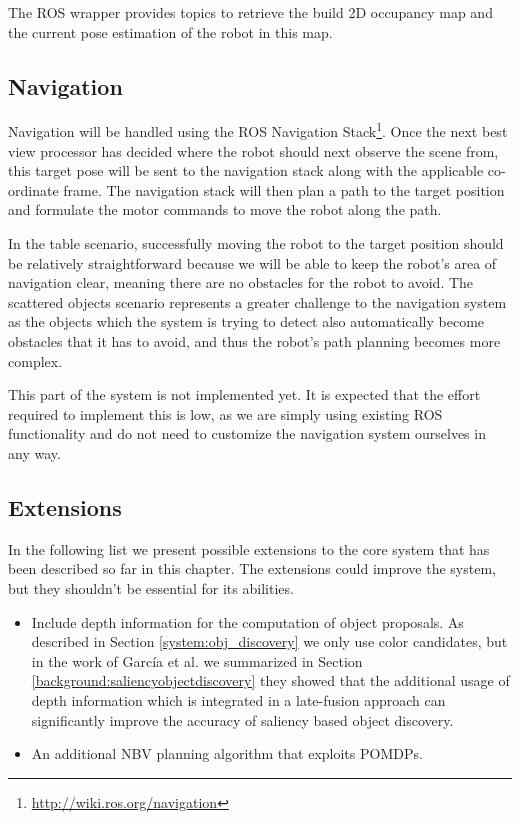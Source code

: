 \documentclass[a4paper,11pt,english]{article}
\begin{document}
The ROS wrapper provides topics to retrieve the build 2D occupancy map and the current pose estimation of the robot in this map.

\subsection{Navigation}
\label{system:navigation}
Navigation will be handled using the ROS Navigation Stack\footnote{\url{http://wiki.ros.org/navigation}}.
Once the next best view processor has decided where the robot should next observe the scene from, this target pose will be sent to the navigation stack along with the applicable co-ordinate frame.
The navigation stack will then plan a path to the target position and formulate the motor commands to move the robot along the path.

In the table scenario, successfully moving the robot to the target position should be relatively straightforward because we will be able to keep the robot's area of navigation clear, meaning there are no obstacles for the robot to avoid.
The scattered objects scenario represents a greater challenge to the navigation system as the objects which the system is trying to detect also automatically become obstacles that it has to avoid, and thus the robot's path planning becomes more complex.

This part of the system is not implemented yet. It is expected that the effort required to implement this is low, as we are simply using existing ROS functionality and do not need to customize the navigation system ourselves in any way.

\subsection{Extensions}
\label{system:extensions}
In the following list we present possible extensions to the core system that has been described so far in this chapter. 
The extensions could improve the system, but they shouldn't be essential for its abilities.

\begin{itemize}
	\item Include depth information for the computation of object proposals.
	As described in Section \ref{system:obj_discovery} we only use color candidates, but in the work of García et al. we summarized in Section \ref{background:saliencyobjectdiscovery} they showed that the additional usage of depth information which is integrated in a late-fusion approach can significantly improve the accuracy of saliency based object discovery.
	\item An additional NBV planning algorithm that exploits POMDPs.
\end{itemize}
\end{document}
